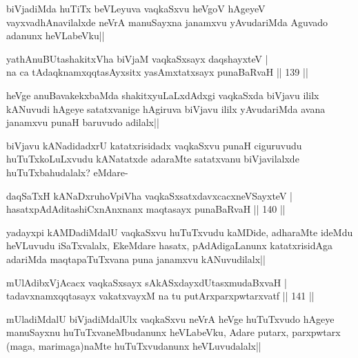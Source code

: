 \begin{artha}
biVjadiMda huTiTx beVLeyuva vaqkaSxvu heVgoV hAgeyeV vayxvadhAnavilalxde neVrA manuSayxna janamxvu yAvudariMda Aguvado adanunx heVLabeVku||
\end{artha}

\begin{shl}
yathA\s nuBUtashakitxVha biVjaM vaqkaSxsayx daqshayxteV |\\
na ca tAdaqknamxqqtasAyxsitx yasAmxtatxsayx punaBaRvaH \hfill || 139 ||
\end{shl}

\begin{artha}
heVge anuBavakekxbaMda shakitxyuLaLxdAdxgi vaqkaSxda biVjavu ililx kANuvudi hAgeye satatxvanige hAgiruva biVjavu ililx yAvudariMda avana janamxvu punaH baruvudo adilalx||

biVjavu kANadidadxrU katatxrisidadx vaqkaSxvu punaH ciguruvudu huTuTxkoLuLxvudu kANatatxde adaraMte satatxvanu biVjavilalxde huTuTxbahudalalx? eMdare-
\end{artha}

\begin{shl}
daqSaTxH kANaDxruhoV\s piVha vaqkaSxsatxdavxcacxneVSayxteV |\\
hasatxpAdAditashiCxnAnxnanx maqtasayx punaBaRvaH \hfill || 140 ||
\end{shl}

\begin{artha}
yadayxpi kAMDadiMdalU vaqkaSxvu huTuTxvudu kaMDide, adharaMte ideMdu heVLuvudu iSaTxvalalx, EkeMdare hasatx, pAdAdigaLanunx katatxrisidAga adariMda maqtapaTuTxvana puna janamxvu kANuvudilalx||
\end{artha}


\begin{shl}
mUlAdibxVjAcacx vaqkaSxsayx sAkASxdayxdUtasxmudaBxvaH |\\
tadavxnamxqqtasayx vakatxvayxM na tu putArxparxpwtarxvatf \hfill || 141 ||
\end{shl}

\begin{artha}%
mUladiMdalU biVjadiMdalUlx vaqkaSxvu neVrA heVge huTuTxvudo hAgeye manuSayxnu huTuTxvaneMbudanunx heVLabeVku, Adare putarx, parxpwtarx (maga, marimaga)naMte huTuTxvudanunx heVLuvudalalx||
\end{artha}


